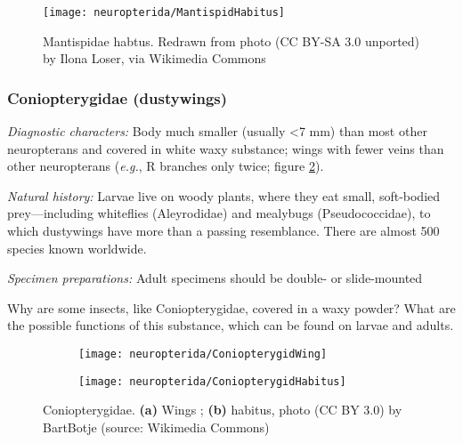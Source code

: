 \begin{figure}[ht!]
  \centering
    \texttt{[image: neuropterida/MantispidHabitus]}
  \caption{Mantispidae habtus. Redrawn from photo (CC BY-SA 3.0 unported) by Ilona Loser, via Wikimedia Commons}
  \label{fig:mantispid}
\end{figure}%

\subsubsection{Coniopterygidae (dustywings)}
\noindent{}\textit{Diagnostic characters:} Body much smaller (usually \textless7 mm) than most other neuropterans and covered in white waxy substance; wings with fewer veins than other neuropterans (\textit{e.g.}, R branches only twice; figure \ref{fig:coniopterygid1}).\vspace{3mm}

\noindent{}\textit{Natural history:} Larvae live on woody plants, where they eat small, soft-bodied prey---including whiteflies (Aleyrodidae) and mealybugs (Pseudococcidae), to which dustywings have more than a passing resemblance. There are almost 500 species known worldwide.\vspace{3mm}

\noindent{}\textit{Specimen preparations:} Adult specimens should be double- or slide-mounted 

\begin{theo}
{}Why are some insects, like Coniopterygidae, covered in a waxy powder? What are the possible functions of this substance, which can be found on larvae and adults.
\end{theo}

\begin{figure}[ht!]
    \centering
    \begin{subfigure}[ht!]{0.32\textwidth}
        \texttt{[image: neuropterida/ConiopterygidWing]}
        \caption{}
        \label{fig:coniopterygid1}
    \end{subfigure}
    \qquad
    \begin{subfigure}[ht!]{0.48\textwidth}
        \texttt{[image: neuropterida/ConiopterygidHabitus]}
        \caption{}
        \label{fig:coniopterygid2}
    \end{subfigure}
    \caption{Coniopterygidae. \textbf{(a)} Wings \citep[][Fig. 211]{comstock1918wings}; \textbf{(b)} habitus, photo (CC BY 3.0) by BartBotje (source: Wikimedia Commons)}\label{fig:coniopterygids}%
\end{figure}
\FloatBarrier

